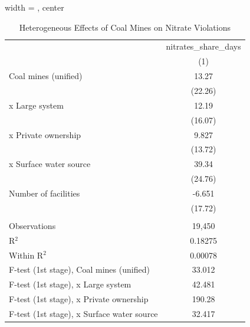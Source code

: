 
\begin{table}[htbp]
   
   \caption{\label{tab:het_unified} Heterogeneous Effects of Coal Mines on Nitrate Violations}
   \bigskip
   
   \centering
   
   \begin{adjustbox}{width = \textwidth, center}
      
      
      \begin{tabular}{lc}
         \toprule
         
                                                      & nitrates\_share\_days\\    
         
                                                      & (1)\\  
         
         \midrule 
         Coal mines (unified)                         & 13.27\\   
                                                      & (22.26)\\   
           x Large system                             & 12.19\\   
                                                      & (16.07)\\   
           x Private ownership                        & 9.827\\   
                                                      & (13.72)\\   
           x Surface water source                     & 39.34\\   
                                                      & (24.76)\\   
         Number of facilities                         & -6.651\\   
                                                      & (17.72)\\   
         
          \\
         
         Observations                                 & 19,450\\  
         R$^2$                                        & 0.18275\\  
         Within R$^2$                                 & 0.00078\\  
         F-test (1st stage), Coal mines (unified)     & 33.012\\  
         F-test (1st stage),   x Large system         & 42.481\\  
         F-test (1st stage),   x Private ownership    & 190.28\\  
         F-test (1st stage),   x Surface water source & 32.417\\  
         

\end{tabular}
\end{adjustbox}
\end{table}
